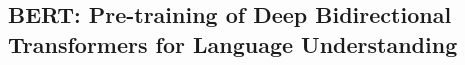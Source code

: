 

\subsection{BERT: Pre-training of Deep Bidirectional Transformers for Language Understanding} \label{sec:stateofart:bert}

